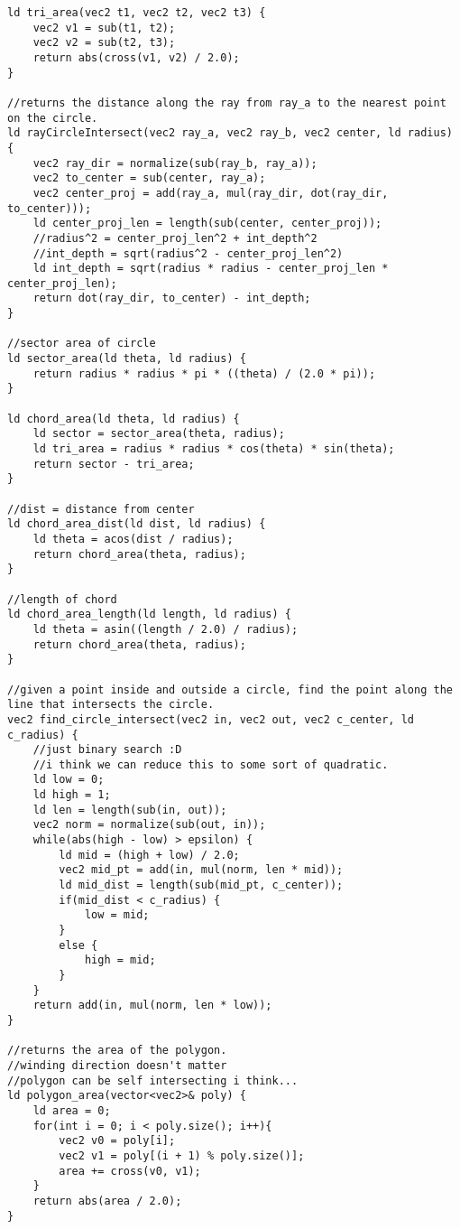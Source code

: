 \documentclass[8pt, headheight=10pt, a4paper]{article}
\begin{document}
\begin{multicols*}{3}
\begin{lstlisting}
ld tri_area(vec2 t1, vec2 t2, vec2 t3) {
    vec2 v1 = sub(t1, t2);
    vec2 v2 = sub(t2, t3);
    return abs(cross(v1, v2) / 2.0);
}

//returns the distance along the ray from ray_a to the nearest point on the circle. 
ld rayCircleIntersect(vec2 ray_a, vec2 ray_b, vec2 center, ld radius) {
    vec2 ray_dir = normalize(sub(ray_b, ray_a));
    vec2 to_center = sub(center, ray_a);
    vec2 center_proj = add(ray_a, mul(ray_dir, dot(ray_dir, to_center)));
    ld center_proj_len = length(sub(center, center_proj));
    //radius^2 = center_proj_len^2 + int_depth^2
    //int_depth = sqrt(radius^2 - center_proj_len^2)
    ld int_depth = sqrt(radius * radius - center_proj_len * center_proj_len);
    return dot(ray_dir, to_center) - int_depth;
}

//sector area of circle 
ld sector_area(ld theta, ld radius) {
    return radius * radius * pi * ((theta) / (2.0 * pi));
}

ld chord_area(ld theta, ld radius) {
    ld sector = sector_area(theta, radius);
    ld tri_area = radius * radius * cos(theta) * sin(theta);
    return sector - tri_area;
}

//dist = distance from center
ld chord_area_dist(ld dist, ld radius) {
    ld theta = acos(dist / radius);
    return chord_area(theta, radius);
}

//length of chord
ld chord_area_length(ld length, ld radius) {
    ld theta = asin((length / 2.0) / radius);
    return chord_area(theta, radius);
}

//given a point inside and outside a circle, find the point along the line that intersects the circle.
vec2 find_circle_intersect(vec2 in, vec2 out, vec2 c_center, ld c_radius) {
    //just binary search :D
    //i think we can reduce this to some sort of quadratic. 
    ld low = 0;
    ld high = 1;
    ld len = length(sub(in, out));
    vec2 norm = normalize(sub(out, in));
    while(abs(high - low) > epsilon) {
        ld mid = (high + low) / 2.0;
        vec2 mid_pt = add(in, mul(norm, len * mid));
        ld mid_dist = length(sub(mid_pt, c_center));
        if(mid_dist < c_radius) {
            low = mid;
        }
        else {
            high = mid;
        }
    }
    return add(in, mul(norm, len * low));
}

//returns the area of the polygon. 
//winding direction doesn't matter
//polygon can be self intersecting i think...
ld polygon_area(vector<vec2>& poly) {
    ld area = 0;
    for(int i = 0; i < poly.size(); i++){
        vec2 v0 = poly[i];
        vec2 v1 = poly[(i + 1) % poly.size()];
        area += cross(v0, v1);
    }
    return abs(area / 2.0);
}


\end{lstlisting}
\end{multicols*}
\end{document}
